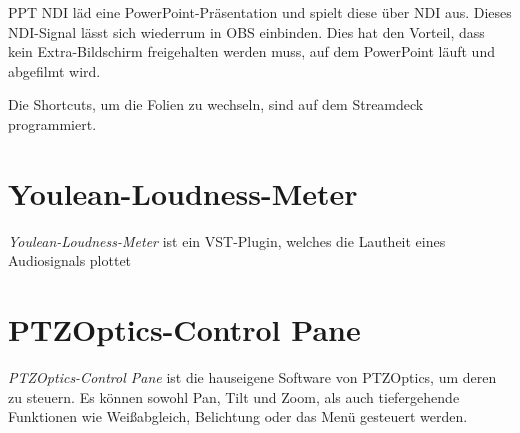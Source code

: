 		PPT NDI läd eine PowerPoint-Präsentation und spielt diese über \Gls{NDI} aus.
		Dieses \Gls{NDI}-Signal lässt sich wiederrum in \Gls{OBS} einbinden.
		Dies hat den Vorteil, dass kein Extra-Bildschirm freigehalten werden muss, auf dem PowerPoint läuft und abgefilmt wird.

		Die Shortcuts, um die Folien zu wechseln, sind auf dem Streamdeck programmiert.
	\section{Youlean-Loudness-Meter}
		\textit{Youlean-Loudness-Meter} ist ein \Gls{VST-Plugin}, welches die \Gls{Lautheit} eines Audiosignals plottet
	\section{PTZOptics-Control Pane}
		\textit{PTZOptics-Control Pane} ist die hauseigene Software von PTZOptics, um deren  zu steuern.
		Es können sowohl Pan, Tilt und Zoom, als auch tiefergehende Funktionen wie Weißabgleich, Belichtung oder das Menü gesteuert werden.